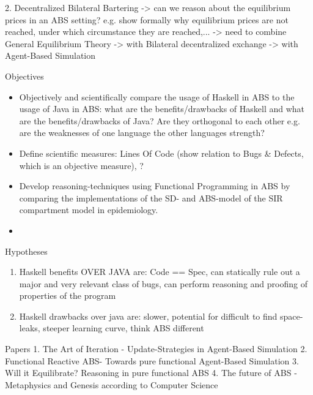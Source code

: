 	2. Decentralized Bilateral Bartering
		-> can we reason about the equilibrium prices in an ABS setting? e.g. show formally why equilibrium prices are not reached, under which circumstance they are reached,...
			-> need to combine General Equilibrium Theory
			-> with Bilateral decentralized exchange
			-> with Agent-Based Simulation 
			

Objectives
\begin{itemize}
	\item Objectively and scientifically compare the usage of Haskell in ABS to the usage of Java in ABS: what are the benefits/drawbacks of Haskell and what are the benefits/drawbacks of Java? Are they orthogonal to each other e.g. are the weaknesses of one language the other languages strength?
	\item Define scientific measures: Lines Of Code (show relation to Bugs \& Defects, which is an objective measure), ?
	\item Develop reasoning-techniques using Functional Programming in ABS by comparing the implementations of the SD- and ABS-model of the SIR compartment model in epidemiology.
	\item 
\end{itemize}

Hypotheses
\begin{enumerate}
	\item Haskell benefits OVER JAVA are: Code == Spec, can statically rule out a major and very relevant class of bugs, can perform reasoning and proofing of properties of the program
	\item Haskell drawbacks over java are: slower, potential for difficult to find space-leaks, steeper learning curve, think ABS different 
\end{enumerate}

Papers
1. The Art of Iteration - Update-Strategies in Agent-Based Simulation
2. Functional Reactive ABS- Towards pure functional Agent-Based Simulation
3. Will it Equilibrate? Reasoning in pure functional ABS
4. The future of ABS - Metaphysics and Genesis according to Computer Science

